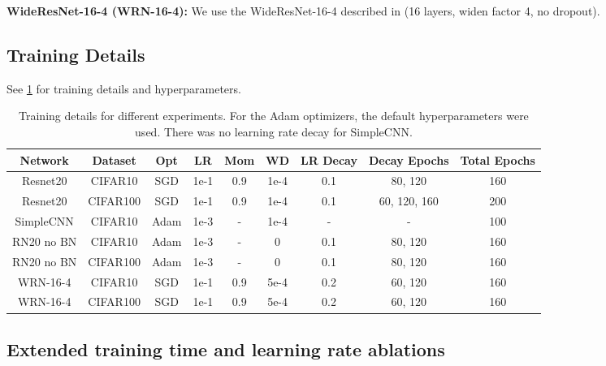 \documentclass{article}
\begin{document}
\textbf{WideResNet-16-4 (WRN-16-4):}
We use the WideResNet-16-4 described in \citep{zagoruyko2016wide} (16 layers, widen factor 4, no dropout).

\subsection{Training Details}

See \cref{tab:training-deets} for training details and hyperparameters.
\begin{table}[]
\begin{tabular}{|c|c|c|c|c|c|c|c|c|}
\hline
Network    & Dataset  & Opt  & LR   & Mom & WD   & LR Decay & Decay Epochs & Total Epochs \\ \hline
Resnet20   & CIFAR10  & SGD  & 1e-1 & 0.9 & 1e-4 & 0.1      & 80, 120      & 160          \\
Resnet20   & CIFAR100 & SGD  & 1e-1 & 0.9 & 1e-4 & 0.1      & 60, 120, 160 & 200          \\
SimpleCNN  & CIFAR10  & Adam & 1e-3 & -   & 1e-4 & -        & -            & 100          \\
RN20 no BN & CIFAR10  & Adam & 1e-3 & -   & 0    & 0.1      & 80, 120      & 160          \\
RN20 no BN & CIFAR100 & Adam & 1e-3 & -   & 0    & 0.1      & 80, 120      & 160          \\
WRN-16-4   & CIFAR10  & SGD  & 1e-1 & 0.9 & 5e-4 & 0.2      & 60, 120      & 160          \\ 
WRN-16-4   & CIFAR100  & SGD  & 1e-1 & 0.9 & 5e-4 & 0.2      & 60, 120      & 160          \\ 
\hline
\end{tabular}
\caption{Training details for different experiments. For the Adam optimizers, the default hyperparameters were used. There was no learning rate decay for SimpleCNN.}
\label{tab:training-deets}
\end{table}

\subsection{Extended training time and learning rate ablations}
\end{document}
